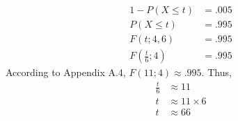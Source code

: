 \documentclass[letterpaper,12pt]{article}
\begin{document}
\begin{enumerate}
\begin{enumerate}
\begin{align*}
          1 - P(X \le t) &= .005 \\
          P(X \le t) &= .995 \\
          F(t; 4, 6) &= .995 \\
          F\left(\frac{t}{6}; 4\right) &= .995
        \end{align*}
        According to Appendix A.4, $F(11; 4) \approx .995$. Thus,
        \begin{align*}
          \frac{t}{6} &\approx 11 \\
          t &\approx 11 \times 6 \\
          t &\approx 66
        \end{align*}
    \end{enumerate}
\end{enumerate}
\end{document}
